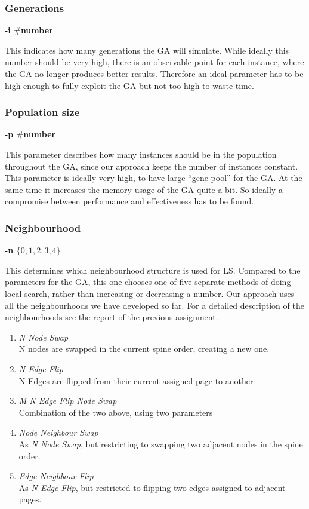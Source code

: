 \documentclass [11pt]{article}
\begin{document}
\subsubsection{Generations} \textbf{-i $\#$number} 

This indicates how many generations the GA will simulate. While ideally this number should be very high, there is an observable point for each instance, where the GA no longer produces better results. Therefore an ideal parameter has to be high enough to fully exploit the GA but not too high to waste time. 

\subsubsection{Population size} \textbf{-p $\#$number}

This parameter describes how many instances should be in the population throughout the GA, since our approach keeps the number of instances constant. This parameter is ideally very high, to have large ``gene pool'' for the GA. At the same time it increases the memory usage of the GA quite a bit. So ideally a compromise between performance and effectiveness has to be found. 

\subsubsection{ Neighbourhood} \textbf{-n $\{ 0,1,2,3,4\} $}

This determines which neighbourhood structure is used for LS. Compared to the parameters for the GA, this one chooses one of five separate methods of doing local search, rather than increasing or decreasing a number. Our approach uses all the neighbourhoods we have developed so far. For a detailed description of the neighbourhoods see the report of the previous assignment.

\begin{enumerate}\addtocounter{enumi}{-1}
  \item \emph{N Node Swap} \\ 
  N nodes are swapped in the current spine order, creating a new one. 
  \item\emph{ N Edge Flip} \\ 
  N Edges are flipped from their current assigned page to another 
  \item \emph{M N Edge Flip Node Swap} \\
  Combination of the two above, using two parameters 
  \item \emph{Node Neighbour Swap }\\ 
  As \emph{N Node Swap}, but restricting to swapping two adjacent nodes in the spine order. 
  \item  \emph{Edge Neighbour Flip} \\
  As \emph{N Edge Flip}, but restricted to flipping two edges assigned to adjacent pages. 
\end{enumerate}
\end{document}
